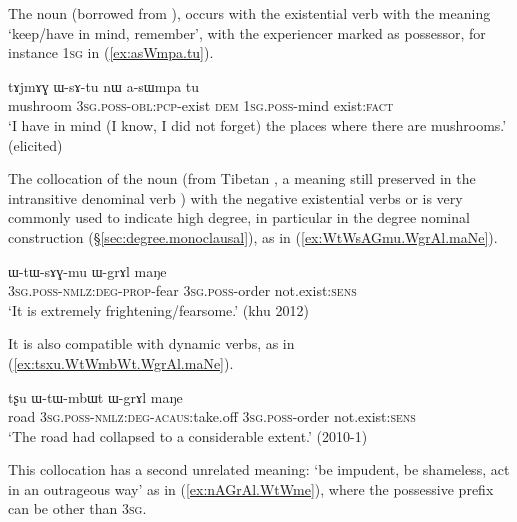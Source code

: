 The noun  (borrowed from ),  occurs with the existential verb  with the meaning `keep/have in mind, remember', with the experiencer marked as possessor, for instance \textsc{1sg} in (\ref{ex:asWmpa.tu}).

\begin{exe}
\ex \label{ex:asWmpa.tu}
\gll  tɤjmɤɣ ɯ-sɤ-tu nɯ a-sɯmpa tu \\
mushroom \textsc{3sg}.\textsc{poss}-\textsc{obl}:\textsc{pcp}-exist \textsc{dem} \textsc{1sg}.\textsc{poss}-mind exist:\textsc{fact} \\
\glt `I have in mind (I know, I did not forget) the places where there are mushrooms.' (elicited)
\end{exe}

The collocation of the noun  (from Tibetan , a meaning still preserved in the intransitive denominal verb ) with the negative existential verbs  or  is very commonly used to indicate high degree,  in particular in the degree nominal construction (§\ref{sec:degree.monoclausal}), as in (\ref{ex:WtWsAGmu.WgrAl.maNe}).

\begin{exe}
\ex \label{ex:WtWsAGmu.WgrAl.maNe}
\gll  ɯ-tɯ-sɤɣ-mu ɯ-grɤl maŋe \\
\textsc{3sg}.\textsc{poss}-\textsc{nmlz}:\textsc{deg}-\textsc{prop}-fear \textsc{3sg}.\textsc{poss}-order not.exist:\textsc{sens} \\
\glt `It is extremely frightening/fearsome.' (khu 2012)
\end{exe}

It is also compatible with dynamic verbs, as in (\ref{ex:tsxu.WtWmbWt.WgrAl.maNe}).

\begin{exe}
\ex \label{ex:tsxu.WtWmbWt.WgrAl.maNe}
\gll  tʂu ɯ-tɯ-mbɯt ɯ-grɤl maŋe \\
road \textsc{3sg}.\textsc{poss}-\textsc{nmlz}:\textsc{deg}-\textsc{acaus}:take.off  \textsc{3sg}.\textsc{poss}-order not.exist:\textsc{sens}  \\
\glt `The road had collapsed to a considerable extent.' (2010-1)
\end{exe}


This collocation has a second unrelated meaning: `be impudent, be shameless, act in an outrageous way' as in (\ref{ex:nAGrAl.WtWme}), where the possessive prefix can be other than \textsc{3sg}.


